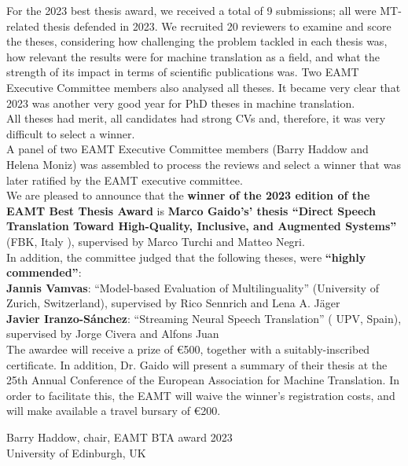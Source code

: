 For the 2023 best thesis award, we received a total of 9 submissions; all were MT-related thesis defended in 2023.  We recruited 20 reviewers to examine and score the theses, considering how challenging the problem tackled in each thesis was, how relevant the results were for machine translation as a field, and what the strength of its impact in terms of scientific publications was. Two EAMT Executive Committee members also analysed all theses. It became very clear that 2023 was another very good year for PhD theses in machine translation. 
\\

All theses had merit, all candidates had strong CVs and, therefore, it was very difficult to select a winner.
\\

A panel of two EAMT Executive Committee members (Barry Haddow and Helena Moniz) was assembled to process the reviews and select a winner that was later ratified by the EAMT executive committee.
\\

We are pleased to announce that the {\bf winner of the 2023 edition of the EAMT Best Thesis Award} is {\bf Marco Gaido's' thesis ``Direct Speech Translation Toward High-Quality, Inclusive, and Augmented Systems''} (FBK, Italy ), supervised by Marco Turchi and Matteo Negri.
\\

In addition, the committee judged  that the following theses, were {\bf ``highly commended''}:
\\
{\bf Jannis Vamvas}: “Model-based Evaluation of Multilinguality” (University of Zurich, Switzerland), supervised by Rico Sennrich and Lena A. Jäger
\\

{\bf Javier Iranzo-Sánchez}: ``Streaming Neural Speech Translation'' ( UPV, Spain), supervised by Jorge Civera and Alfons Juan 
\\

The awardee will receive a prize of €500, together with a suitably-inscribed certificate. In addition, Dr. Gaido will present a summary of their thesis at the 25th Annual Conference of the European Association for Machine Translation.  In order to facilitate this, the EAMT will waive the winner's registration costs, and will make available a travel bursary of €200.


\bigbreak

Barry Haddow, chair, EAMT BTA award 2023 \\
University of Edinburgh, UK
